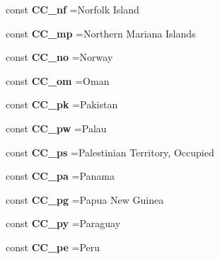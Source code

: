 \begin{DoxyCompactItemize}
const {\bfseries C\+C\+\_\+nf} =\textquotesingle{}Norfolk Island\textquotesingle{}
\item 
\hypertarget{class_i_s_o_aecc97d6475bd60e82464cfec6d8adfcf}{}\label{class_i_s_o_aecc97d6475bd60e82464cfec6d8adfcf} 
const {\bfseries C\+C\+\_\+mp} =\textquotesingle{}Northern Mariana Islands\textquotesingle{}
\item 
\hypertarget{class_i_s_o_a2dfa1776fdbd82117ad61b9f506ca7c0}{}\label{class_i_s_o_a2dfa1776fdbd82117ad61b9f506ca7c0} 
const {\bfseries C\+C\+\_\+no} =\textquotesingle{}Norway\textquotesingle{}
\item 
\hypertarget{class_i_s_o_a548d2f5eac251436233dddbe9f3843da}{}\label{class_i_s_o_a548d2f5eac251436233dddbe9f3843da} 
const {\bfseries C\+C\+\_\+om} =\textquotesingle{}Oman\textquotesingle{}
\item 
\hypertarget{class_i_s_o_adcc467f410f7c00faa4bfd03bf20dd6a}{}\label{class_i_s_o_adcc467f410f7c00faa4bfd03bf20dd6a} 
const {\bfseries C\+C\+\_\+pk} =\textquotesingle{}Pakistan\textquotesingle{}
\item 
\hypertarget{class_i_s_o_a01d4aacf5bdcdbd756f516e798a5c284}{}\label{class_i_s_o_a01d4aacf5bdcdbd756f516e798a5c284} 
const {\bfseries C\+C\+\_\+pw} =\textquotesingle{}Palau\textquotesingle{}
\item 
\hypertarget{class_i_s_o_aa877e030f8476771107a91482f9b43c3}{}\label{class_i_s_o_aa877e030f8476771107a91482f9b43c3} 
const {\bfseries C\+C\+\_\+ps} =\textquotesingle{}Palestinian Territory, Occupied\textquotesingle{}
\item 
\hypertarget{class_i_s_o_a07eb0264fed4332cf4e75b905ff81fef}{}\label{class_i_s_o_a07eb0264fed4332cf4e75b905ff81fef} 
const {\bfseries C\+C\+\_\+pa} =\textquotesingle{}Panama\textquotesingle{}
\item 
\hypertarget{class_i_s_o_a605ebe9041029f1d0fa0a127c236d410}{}\label{class_i_s_o_a605ebe9041029f1d0fa0a127c236d410} 
const {\bfseries C\+C\+\_\+pg} =\textquotesingle{}Papua New Guinea\textquotesingle{}
\item 
\hypertarget{class_i_s_o_a9c6dbd45f62802cd5872961e4e39698c}{}\label{class_i_s_o_a9c6dbd45f62802cd5872961e4e39698c} 
const {\bfseries C\+C\+\_\+py} =\textquotesingle{}Paraguay\textquotesingle{}
\item 
\hypertarget{class_i_s_o_a513d53443ab2b6a1c951c20e642acd8b}{}\label{class_i_s_o_a513d53443ab2b6a1c951c20e642acd8b} 
const {\bfseries C\+C\+\_\+pe} =\textquotesingle{}Peru\textquotesingle{}
\item 
\hypertarget{class_i_s_o_a38a0f1495c706869a3e0eba2334db9f2}{}\label{class_i_s_o_a38a0f1495c706869a3e0eba2334db9f2} 

\end{DoxyCompactItemize}
